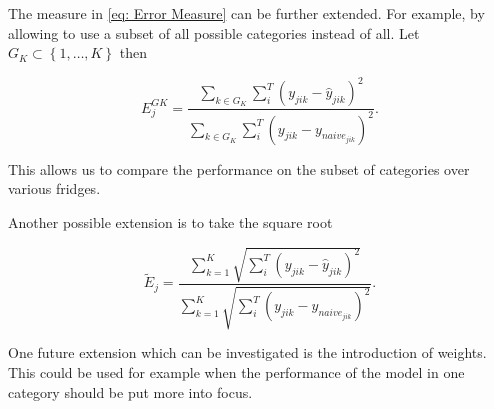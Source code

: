 The measure in \ref{eq: Error Measure} can be further extended. For example, by allowing to use a subset of all possible categories instead of all. Let $G_K \subset \left\{1,\ldots,K\right\}$ then

\begin{equation}
E^{GK}_{j}=\frac{\sum_{k \in G_K}\sum_{i}^T(y_{jik}-\hat{y}_{jik})^2}{\sum_{k \in G_K}\sum_{i}^T(y_{jik}-y_{naive_{jik}})^2}.
\label{eq: Error Measure Subsets}
\end{equation}

This allows us to compare the performance on the subset of categories over various fridges. 

Another possible extension is to take the square root

\begin{equation}
\widetilde{E}_j=\frac{\sum_{k=1}^{K}\sqrt{\sum_{i}^T(y_{jik}-\hat{y}_{jik})^2}}{\sum_{k=1}^{K}\sqrt{\sum_{i}^T(y_{jik}-y_{naive_{jik}})^2}}.
\label{eq: Error Measure Sqrt} 
\end{equation}

One future extension which can be investigated is the introduction of weights. This could be used for example when the performance of the model in one category should be put more into focus. 